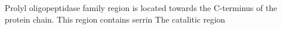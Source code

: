 Prolyl oligopeptidase family region is located towards the C-terminus of the protein chain. This region contains serrin The catalitic region 